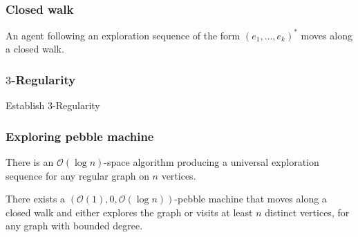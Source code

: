 \documentclass{beamer}
\begin{document}
\begin{frame}
  \frametitle{Closed walk}
  \begin{mdframed}[linecolor=magenta]
    \begin{lemma}
      An agent following an exploration sequence of the form
      $(e_{1},\dots,e_{k})^{\ast}$ moves along a closed walk.
    \end{lemma}
  \end{mdframed}
\end{frame}

\begin{frame}
  \frametitle{$3$-Regularity}
  \begin{mdframed}[linecolor=purple]
    Establish $3$-Regularity
  \end{mdframed}
  \begin{center}
  \end{center}
\end{frame}

\begin{frame}
  \frametitle{Exploring pebble machine}
  \begin{mdframed}
    \begin{theorem}[Reingold]
      There is an $\mathcal{O}(\log n)$-space algorithm producing a universal
      exploration sequence for any regular graph on $n$ vertices.
    \end{theorem}
  \end{mdframed}
  \begin{center}
  \end{center}
  \begin{mdframed}
    \begin{theorem}
      There exists a $(\mathcal{O}(1), 0, \mathcal{O}(\log n))$-pebble machine
      that moves along a closed walk and either explores the graph or visits at
      least $n$ distinct vertices, for any graph with bounded degree.
    \end{theorem}
  \end{mdframed}
\end{frame}
\end{document}
